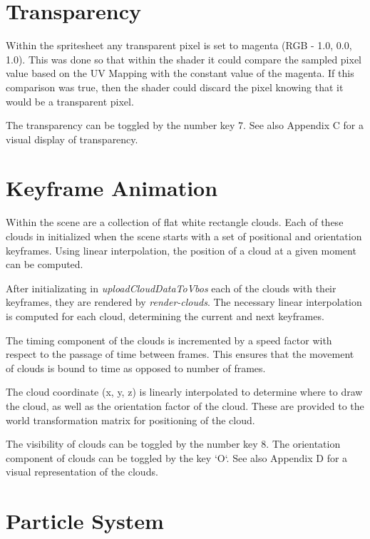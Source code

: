 \documentclass{book}
\begin{document}
\section{Transparency}
    
Within the spritesheet any transparent pixel is set to magenta (RGB - 1.0, 0.0, 1.0).  This was done so that within the shader it could compare the sampled pixel value based on the UV Mapping with the constant value of the magenta.  If this comparison was true, then the shader could discard the pixel knowing that it would be a transparent pixel.
    
The transparency can be toggled by the number key 7.  See also Appendix C for a visual display of transparency.
    
\section{Keyframe Animation}
    
Within the scene are a collection of flat white rectangle clouds.  Each of these clouds in initialized when the scene starts with a set of positional and orientation keyframes.  Using linear interpolation, the position of a cloud at a given moment can be computed.
    
After initializating in \textit{uploadCloudDataToVbos} each of the clouds with their keyframes, they are rendered by \textit{render-clouds}.  The necessary linear interpolation is computed for each cloud, determining the current and next keyframes.
    
The timing component of the clouds is incremented by a speed factor with respect to the passage of time between frames.  This ensures that the movement of clouds is bound to time as opposed to number of frames.  
    
The cloud coordinate (x, y, z) is linearly interpolated to determine where to draw the cloud, as well as the orientation factor of the cloud.  These are provided to the world transformation matrix for positioning of the cloud.
    
The visibility of clouds can be toggled by the number key 8.  The orientation component of clouds can be toggled by the key `O`.  See also Appendix D for a visual representation of the clouds.
    
\section{Particle System}
    
\end{document}
